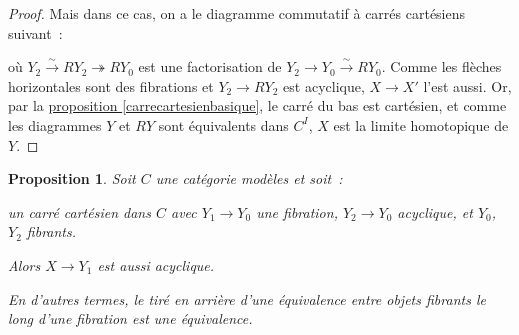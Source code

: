 \documentclass{amsart}
\newcommand{\sref}[2]{\hyperref[#2]{#1 \ref*{#2}}}
\theoremstyle{plain}
\newtheorem{prop}[theo]{Proposition}
\theoremstyle{definition}
\theoremstyle{remark}
\newcommand{\ra}{\rightarrow}
\begin{document}
\begin{proof}
  Mais dans ce cas, on a le diagramme commutatif à carrés cartésiens suivant~:
  \begin{center}
  \end{center}
  où $Y_2\overset{\sim}{\ra} RY_2\twoheadrightarrow RY_0$ est une factorisation de $Y_2\ra Y_0\overset{\sim}{\ra} RY_0$.
  Comme les flèches horizontales sont des fibrations et $Y_2\ra RY_2$ est acyclique,
  $X\ra X'$ l'est aussi. Or, par la \sref{proposition}{carrecartesienbasique}, le carré du bas est cartésien, et comme les diagrammes
  $Y$ et $RY$ sont équivalents dans $C^I$, $X$ est la limite homotopique de $Y$.
\end{proof}

\begin{prop}\label{homocartesienfibrant}
  Soit $C$ une catégorie modèles et soit~:
  \begin{center}
  \end{center}
  un carré cartésien dans $C$ avec $Y_1\ra Y_0$ une fibration, $Y_2\ra Y_0$ acyclique, et $Y_0$, $Y_2$ fibrants.

  Alors $X\ra Y_1$ est aussi acyclique.

  En d'autres termes, le tiré en arrière d'une équivalence entre objets fibrants le long d'une fibration est une équivalence.
\end{prop}
\end{document}
